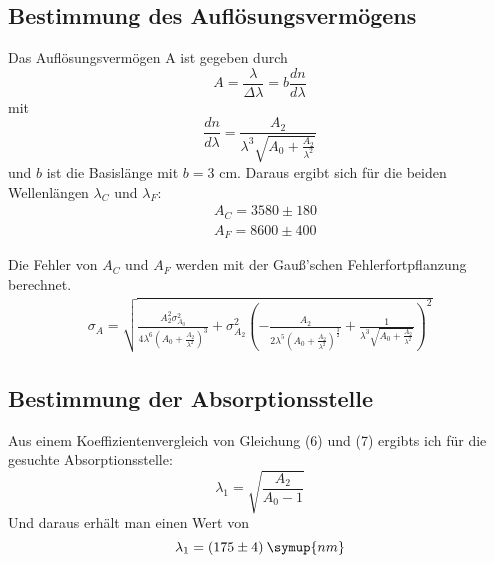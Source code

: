 \subsection{Bestimmung des Auflösungsvermögens}
Das Auflösungsvermögen A ist gegeben durch
\begin{equation*}
  A = \frac{\lambda}{\Delta \lambda} = b\frac{dn}{d\lambda}
\end{equation*}
mit
\begin{equation*}
  \frac{dn}{d\lambda} = \frac{A_2}{\lambda^3\sqrt{A_0 + \frac{A_2}{\lambda^2}}}
\end{equation*}
und $b$ ist die Basislänge mit $b = 3$ cm.
Daraus ergibt sich für die beiden Wellenlängen $\lambda_C$ und $\lambda_F$:
\begin{align*}
  &A_C = 3580 \pm 180 \\
  &A_F = 8600 \pm 400
\end{align*}


Die Fehler von $A_C$ und $A_F$ werden mit der Gauß'schen Fehlerfortpflanzung berechnet.
\begin{align*}
  \sigma_A = \sqrt{\frac{A_2^{2} \sigma_{A_0}^{2}}{4 \lambda^{6} \left(A_0 + \frac{A_2}{\lambda^{2}}\right)^{3}}
  + \sigma_{A_2}^{2} \left(- \frac{A_2}{2 \lambda^{5} \left(A_0 + \frac{A_2}{\lambda^{2}}\right)^{\frac{3}{2}}}
  + \frac{1}{\lambda^{3} \sqrt{A_0 + \frac{A_2}{\lambda^{2}}}}\right)^{2}}
\end{align*}

\subsection{Bestimmung der Absorptionsstelle}
Aus einem Koeffizientenvergleich von Gleichung (6) und (7) ergibts ich für die gesuchte Absorptionsstelle:
\begin{equation*}
  \lambda_1 = \sqrt{\frac{A_2}{A_0 - 1}}
\end{equation*}
Und daraus erhält man einen Wert von
\begin{equation*}
  \lambda_1 = (175 \pm 4) \: \symup{nm}
\end{equation*}
